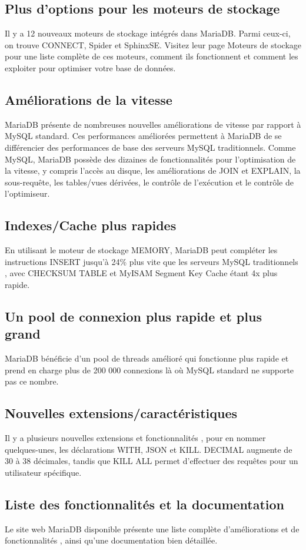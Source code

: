 \subsection{Plus d'options pour les moteurs de stockage}
Il y a 12 nouveaux moteurs de stockage \cite{mysql-maria} intégrés dans MariaDB. Parmi ceux-ci, on trouve CONNECT, Spider et SphinxSE. Visitez leur page Moteurs de stockage pour une liste complète de ces moteurs, comment ils fonctionnent et comment les exploiter pour optimiser votre base de données.
\subsection{Améliorations de la vitesse}
MariaDB présente de nombreuses nouvelles améliorations de vitesse \cite{mysql-maria} par rapport à MySQL standard. Ces performances améliorées permettent à MariaDB de se différencier des performances de base des serveurs MySQL traditionnels. Comme MySQL, MariaDB possède des dizaines de fonctionnalités pour l'optimisation de la vitesse, y compris l'accès au disque, les améliorations de JOIN et EXPLAIN, la sous-requête, les tables/vues dérivées, le contrôle de l'exécution et le contrôle de l'optimiseur.
\subsection{Indexes/Cache plus rapides }
En utilisant le moteur de stockage MEMORY, MariaDB peut compléter les instructions INSERT jusqu'à 24\% plus vite que les serveurs MySQL traditionnels \cite{mysql-maria}, avec CHECKSUM TABLE et MyISAM Segment Key Cache étant 4x plus rapide.
\subsection{Un pool de connexion plus rapide et plus grand}
MariaDB bénéficie d'un pool de threads amélioré \cite{mysql-maria} qui fonctionne plus rapide et prend en charge plus de 200 000 connexions là où MySQL standard ne supporte pas ce nombre.
\subsection{Nouvelles extensions/caractéristiques }
Il y a plusieurs nouvelles extensions et fonctionnalités \cite{mysql-maria}, pour en nommer quelques-unes, les déclarations WITH, JSON et KILL. DECIMAL augmente de 30 à 38 décimales, tandis que KILL ALL permet d'effectuer des requêtes pour un utilisateur spécifique.
\subsection{Liste des fonctionnalités et la documentation }
Le site web MariaDB disponible présente une liste complète d'améliorations et de fonctionnalités \cite{mysql-maria}, ainsi qu’une documentation bien détaillée.
